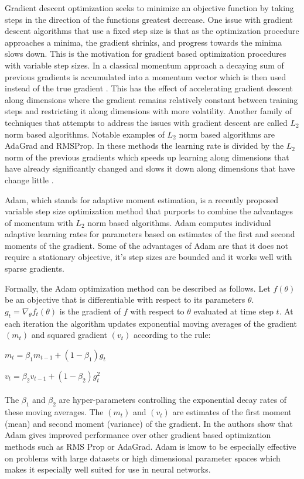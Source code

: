 \documentclass[12pt,letterpaper]{article}
\begin{document}
Gradient descent optimization seeks to minimize an objective function by taking steps in the direction of the functions greatest decrease.  One issue with gradient descent algorithms that use a fixed step size is that as the optimization procedure approaches a minima, the gradient shrinks, and progress towards the minima slows down.  This is the motivation for gradient based optimization procedures with variable step sizes.  In a classical momentum approach a decaying sum of previous gradients is accumulated into a momentum vector which is then used instead of the true gradient \cite{icml2013_sutskever13}.  This has the effect of accelerating gradient descent along dimensions where the gradient remains relatively constant between training steps and restricting it along dimensions with more volatility.  Another family of techniques that attempts to address the issues with gradient descent are called $L_2$ norm based algorithms.  Notable examples of $L_2$ norm based algorithms are AdaGrad and RMSProp.  In these methods the learning rate is divided by the $L_2$ norm of the previous gradients which speeds up learning along dimensions that have already significantly changed and slows it down along dimensions that have change little \cite{Duchi:2011:ASM:1953048.2021068}.  

Adam, which stands for adaptive moment estimation, is a recently proposed variable step size optimization method \cite{journals/corr/KingmaB14} that purports to combine the advantages of momentum with $L_2$ norm based algorithms. Adam computes individual adaptive learning rates for parameters based on estimates of the first and second moments of the gradient.  Some of the advantages of Adam are that it does not require a stationary objective, it's step sizes are bounded and it works well with sparse gradients.  

Formally, the Adam optimization method can be described as follows.  Let $f(\theta)$ be an objective that is differentiable with respect to its parameters $\theta$.  $g_t = \nabla_{\theta}f_t(\theta)$ is the gradient of $f$ with respect to $\theta$ evaluated at time step $t$.   At each iteration the algorithm updates exponential moving averages of the gradient $(m_t)$ and squared gradient $(v_t)$ according to the rule:

$m_t = \beta_1 m_{t-1} + (1 - \beta_1) g_t$

$v_t = \beta_2 v_{t-1} + (1 - \beta_2) g_t^2$
\\
\\
The $\beta_1$ and $\beta_2$ are hyper-parameters controlling the exponential decay rates of these moving averages.  The $(m_t)$ and  $(v_t)$ are estimates of the first moment (mean) and second moment (variance) of the gradient. In \cite{journals/corr/KingmaB14} the authors show that Adam gives improved performance over other gradient based optimization methods such as RMS Prop or AdaGrad.  Adam is know to be especially effective on problems with large datasets or high dimensional parameter spaces which makes it especially well suited for use in neural networks.
\end{document}
